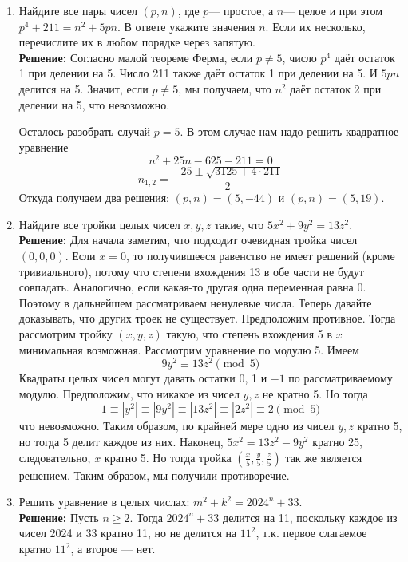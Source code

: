 \documentclass[a4paper,12pt]{article}
\begin{document}
\begin{enumerate}[label=\textbf{Задача \arabic*.}]
\item Найдите все пары чисел $(p, n)$, где $p$--- простое, а $n$--- целое и при этом $p^4 + 211 = n^2 + 5pn$. В ответе укажите значения $n$. Если их несколько, перечислите их в любом порядке через запятую. \\
\textbf{Решение:} Согласно малой теореме Ферма, если $p \neq 5$, число $p^4$ даёт остаток 1 при делении на 5. Число 211 также даёт остаток 1 при делении на 5. И $5pn$ делится на 5. Значит, если $p \neq 5$, мы получаем, что $n^2$ даёт остаток 2 при делении на 5, что невозможно.

Осталось разобрать случай $p = 5$. В этом случае нам надо решить квадратное уравнение
\[ n^2 + 25n - 625 - 211 = 0 \]
\[ n_{1,2} = \frac{-25 \pm \sqrt{3125 + 4 \cdot 211}}{2} \]
Откуда получаем два решения: $(p, n) = (5, -44)$ и $(p, n) = (5, 19)$.

\item Найдите все тройки целых чисел $x, y, z$ такие, что $5x^2 + 9y^2 = 13z^2$. \\
\textbf{Решение:} Для начала заметим, что подходит очевидная тройка чисел $(0, 0, 0)$. Если $x = 0$, то получившееся равенство не имеет решений (кроме тривиального), потому что степени вхождения 13 в обе части не будут совпадать. Аналогично, если какая-то другая одна переменная равна 0. Поэтому в дальнейшем рассматриваем ненулевые числа. Теперь давайте доказывать, что других троек не существует. Предположим противное. Тогда рассмотрим тройку $(x, y, z)$ такую, что степень вхождения 5 в $x$ минимальная возможная.
Рассмотрим уравнение по модулю 5. Имеем
\[ 9y^2 \equiv 13z^2 \pmod{5} \]
Квадраты целых чисел могут давать остатки 0, 1 и $-1$ по рассматриваемому модулю. Предположим, что никакое из чисел $y, z$ не кратно 5. Но тогда
\[ 1 \equiv |y^2| \equiv |9y^2| \equiv |13z^2| \equiv |2z^2| \equiv 2 \pmod{5} \]
что невозможно. Таким образом, по крайней мере одно из чисел $y, z$ кратно 5, но тогда 5 делит каждое из них.
Наконец, $5x^2 = 13z^2 - 9y^2$ кратно 25, следовательно, $x$ кратно 5. Но тогда тройка $(\frac{x}{5}, \frac{y}{5}, \frac{z}{5})$ так же является решением. Таким образом, мы получили противоречие.
\item Решить уравнение в целых числах: $m^2 + k^2 = 2024^n + 33$. \\
\textbf{Решение:} Пусть $n \ge 2$. Тогда $2024^n + 33$ делится на 11, поскольку каждое из чисел 2024 и 33 кратно 11, но не делится на $11^2$, т.к. первое слагаемое кратно $11^2$, а второе --- нет.


\end{enumerate}
\end{document}
